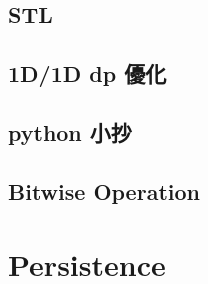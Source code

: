 \subsection{STL}

\subsection{1D/1D dp 優化}

\subsection{python 小抄}

\subsection{Bitwise Operation}



\section{Persistence}

